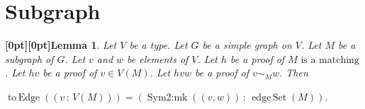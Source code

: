 \documentclass{article}
\makeatletter
\newcommand{\paperanchor}[1]{\hypertarget{#1}{}}%
\def\paperdest{\pdfextension dest}\def\paperstart{\pdfextension startlink}%
\def\paperend{\pdfextension endlink}\def\papercolor{\pdfextension colorstack}%
\let\paperdest\pdfdest\let\paperstart\pdfstartlink\let\paperend\pdfendlink\let\papercolor\pdfcolorstack
\newcommand{\paperanchor}[1]{\paperdest name{#1} xyz}%
\newcommand{\paperanchor}[1]{\special{pdf:dest (#1) [@thispage /XYZ null @ypos null]}}%
\newcommand{\paperlineanchor}[1]{\raisebox{10pt}[0pt][0pt]{\paperanchor{#1}}}
\DeclareRobustCommand{\paperresultname}[1]{\paperlineanchor{theorem:\arabic{theorem}}#1}
\theoremstyle{paperresult}
\newtheorem{lemma}[theorem]{\paperresultname{Lemma}}
\makeatother
\begin{document}
\section{Subgraph}
\begin{lemma}\label{theorem:1}
Let \(V\) be a type. Let \(G\) be a simple graph on \(V\). Let \(M\) be a subgraph of \(G\). Let \(v\) and \(w\) be elements of \(V\). Let \(h\) be a proof of \(M\text{ is a matching}\). Let \(\mathit{hv}\) be a proof of \(v \in V(M)\). Let \(\mathit{hvw}\) be a proof of \(v \sim_{M} w\). Then
\begin{center}
\(\displaystyle \operatorname{to\,Edge}((v\, :\, V(M))) = (\operatorname{Sym2\mathord{:}mk}((v,\allowbreak{} w))\, :\, \operatorname{edge\,Set}(M)).\)
\end{center}
\end{lemma}
\end{document}
